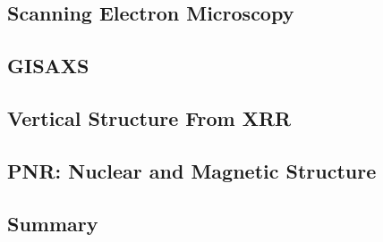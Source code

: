 \documentclass[\main/dresen_thesis.tex]{subfiles}
\renewcommand{\thisPath}{\main/chapters/colloidalCrystals/colloidalCrystals}
\begin{document}
  \subsection{Scanning Electron Microscopy}
  
    \FloatBarrier

  \subsection{GISAXS}
  
    \FloatBarrier

  \subsection{Vertical Structure From XRR}
  
    \FloatBarrier

  \subsection{PNR: Nuclear and Magnetic Structure}
  
    \FloatBarrier

  \clearpage
  \subsection{Summary}
  
    \FloatBarrier
\end{document}
